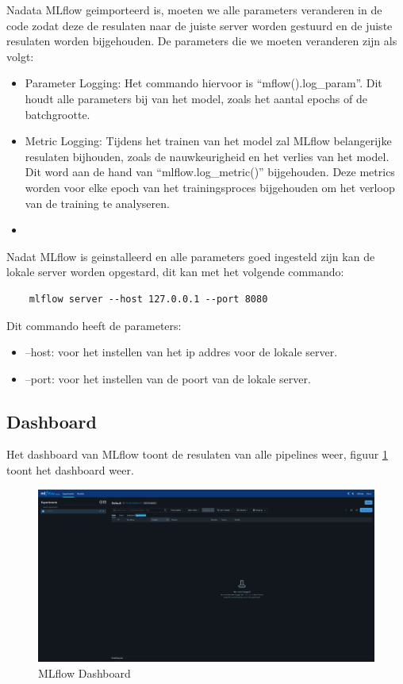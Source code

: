 Nadata MLflow geimporteerd is, moeten we alle parameters veranderen in de code zodat deze de resulaten naar de juiste server worden gestuurd en de juiste resulaten worden bijgehouden.
De parameters die we moeten veranderen zijn als volgt:
\begin{itemize}
    \item Parameter Logging: Het commando hiervoor is ``mflow().log\_param''. Dit houdt alle parameters bij van het model, zoals het aantal epochs of de batchgrootte.
    \item Metric Logging: Tijdens het trainen van het model zal MLflow belangerijke resulaten bijhouden, zoals de nauwkeurigheid en het verlies van het model. Dit word aan de hand van ``mlflow.log\_metric()'' bijgehouden. Deze metrics worden voor elke epoch van het trainingsproces bijgehouden om het verloop van de training te analyseren.
    \item 
\end{itemize}
Nadat MLflow is geinstalleerd en alle parameters goed ingesteld zijn kan de lokale server worden opgestard, dit kan met het volgende commando:
\begin{verbatim}
    mlflow server --host 127.0.0.1 --port 8080
\end{verbatim}
Dit commando heeft de parameters:
\begin{itemize}
    \item --host: voor het instellen van het ip addres voor de lokale server.
    \item --port: voor het instellen van de poort van de lokale server.
\end{itemize}
\subsection{Dashboard}
Het dashboard van MLflow toont de resulaten van alle pipelines weer, figuur \ref{fig:mlflow_dashboard} toont het dashboard weer.
\begin{figure}[]
    \includegraphics[width=\linewidth]{graphics/mlflow_dashboard.PNG}
    \caption{MLflow Dashboard}
    \label{fig:mlflow_dashboard}
\end{figure}
